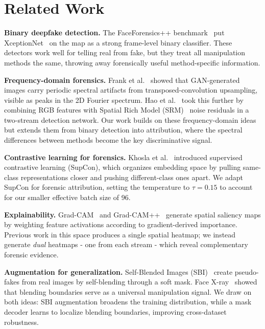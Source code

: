 \section{Related Work}

\textbf{Binary deepfake detection.}
The FaceForensics++ benchmark~\cite{rossler2019faceforensics} put XceptionNet~\cite{chollet2017xception} on the map as a strong frame-level binary classifier. These detectors work well for telling real from fake, but they treat all manipulation methods the same, throwing away forensically useful method-specific information.

\textbf{Frequency-domain forensics.}
Frank et al.~\cite{frank2020leveraging} showed that GAN-generated images carry periodic spectral artifacts from transposed-convolution upsampling, visible as peaks in the 2D Fourier spectrum. Hao et al.~\cite{hao2021twostreamSRM} took this further by combining RGB features with Spatial Rich Model (SRM)~\cite{fridrich2012srm} noise residuals in a two-stream detection network. Our work builds on these frequency-domain ideas but extends them from binary detection into attribution, where the spectral differences between methods become the key discriminative signal.

\textbf{Contrastive learning for forensics.}
Khosla et al.~\cite{khosla2020supervised} introduced supervised contrastive learning (SupCon), which organizes embedding space by pulling same-class representations closer and pushing different-class ones apart. We adapt SupCon for forensic attribution, setting the temperature to $\tau = 0.15$ to account for our smaller effective batch size of 96.

\textbf{Explainability.}
Grad-CAM~\cite{selvaraju2017gradcam} and Grad-CAM++~\cite{chattopadhay2018gradcampp} generate spatial saliency maps by weighting feature activations according to gradient-derived importance. Previous work in this space produces a single spatial heatmap; we instead generate \textit{dual} heatmaps - one from each stream - which reveal complementary forensic evidence.

\textbf{Augmentation for generalization.}
Self-Blended Images (SBI)~\cite{shiohara2022sbi} create pseudo-fakes from real images by self-blending through a soft mask. Face X-ray~\cite{li2020facexray} showed that blending boundaries serve as a universal manipulation signal. We draw on both ideas: SBI augmentation broadens the training distribution, while a mask decoder learns to localize blending boundaries, improving cross-dataset robustness.
